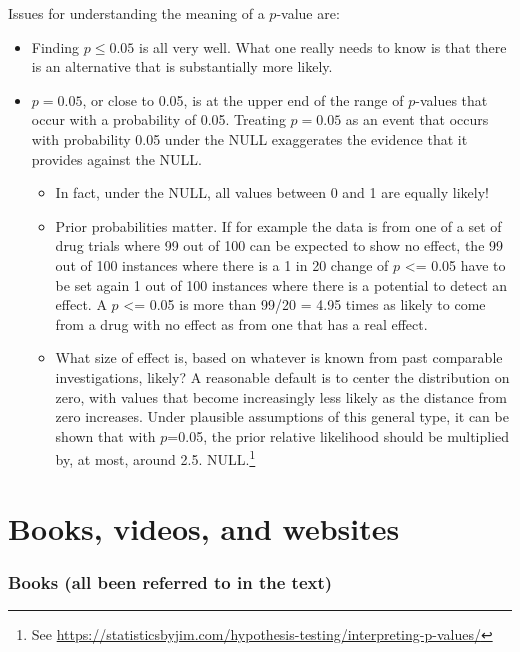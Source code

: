 \documentclass[
  10pt,
  b5paper]{book}
\providecommand{\tightlist}{%
  \setlength{\itemsep}{0pt}\setlength{\parskip}{0pt}}
\begin{document}
Issues for understanding the meaning of a \(p\)-value are:

\begin{itemize}
\tightlist
\item
  Finding \(p \leq 0.05\) is all very well. What one really
  needs to know is that there is an alternative that is
  substantially more likely.
\item
  \(p = 0.05\), or close to 0.05, is at the upper end of the range
  of \(p\)-values that occur with a probability of 0.05. Treating
  \(p = 0.05\) as an event that occurs with probability 0.05 under
  the NULL exaggerates the evidence that it provides
  against the NULL.

  \begin{itemize}
  \tightlist
  \item
    In fact, under the NULL, all values between 0 and 1 are
    equally likely!
  \item
    Prior probabilities matter. If for example the data is
    from one of a set of drug trials where 99 out of 100 can
    be expected to show no effect, the 99 out of 100 instances
    where there is a 1 in 20 change of \(p\) \textless= 0.05 have to be
    set again 1 out of 100 instances where there is a potential
    to detect an effect. A \(p\) \textless= 0.05 is more than 99/20 =
    4.95 times as likely to come from a drug with no effect as
    from one that has a real effect.
  \item
    What size of effect is, based on whatever is known from
    past comparable investigations, likely? A reasonable default
    is to center the distribution on zero, with values that become
    increasingly less likely as the distance from zero increases.
    Under plausible assumptions of this general type, it can be
    shown that with \(p\)=0.05, the prior relative likelihood should
    be multiplied by, at most, around 2.5.
    NULL.\footnote{See \url{https://statisticsbyjim.com/hypothesis-testing/interpreting-p-values/}}
  \end{itemize}
\end{itemize}

\backmatter

\hypertarget{app:more}{%
\chapter{Books, videos, and websites}\label{app:more}}

\hypertarget{books-all-been-referred-to-in-the-text}{%
\subsection{Books (all been referred to in the text)}\label{books-all-been-referred-to-in-the-text}}
\end{document}
